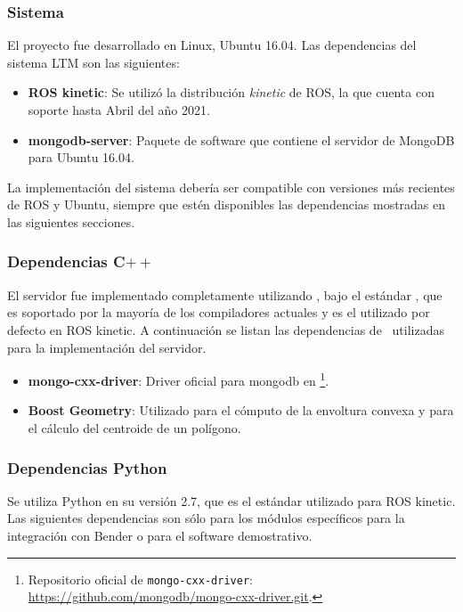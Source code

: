 \subsubsection{Sistema}

El proyecto fue desarrollado en Linux, Ubuntu 16.04. Las dependencias del sistema LTM son las siguientes:

\begin{itemize}
\item {\bfseries ROS kinetic}: Se utilizó la distribución \textit{kinetic} de ROS, la que cuenta con soporte hasta Abril del año 2021.
\item {\bfseries mongodb-server}: Paquete de software que contiene el servidor de MongoDB para Ubuntu 16.04.
\end{itemize}

La implementación del sistema debería ser compatible con versiones más recientes de ROS y Ubuntu, siempre que estén disponibles las dependencias mostradas en las siguientes secciones.


\subsubsection{Dependencias C$++$}

El servidor fue implementado completamente utilizando \CC, bajo el estándar , que es soportado por la mayoría de los compiladores actuales y es el utilizado por defecto en ROS kinetic. A continuación se listan las dependencias de \CC \ utilizadas para la implementación del servidor.

\begin{itemize}
	\item {\bfseries mongo-cxx-driver}: Driver oficial para mongodb en \CC\footnote{Repositorio oficial de \texttt{mongo-cxx-driver}: \url{https://github.com/mongodb/mongo-cxx-driver.git}.}. 
	\item {\bfseries Boost Geometry}: Utilizado para el cómputo de la envoltura convexa y para el cálculo del centroide de un polígono.
\end{itemize}


\subsubsection{Dependencias Python}

Se utiliza Python en su versión 2.7, que es el estándar utilizado para ROS kinetic. Las siguientes dependencias son sólo para los módulos específicos para la integración con Bender o para el software demostrativo.

